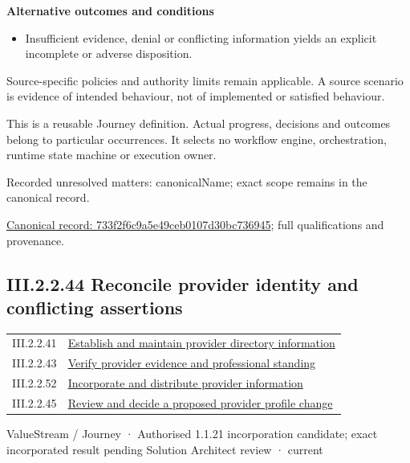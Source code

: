 \par\medskip\textbf{Alternative outcomes and conditions}\par


\begin{itemize}


\item Insufficient evidence, denial or conflicting information yields an explicit incomplete or adverse disposition.

\end{itemize}


Source-specific policies and authority limits remain applicable. A source scenario is evidence of intended behaviour, not of implemented or satisfied behaviour.



This is a reusable Journey definition. Actual progress, decisions and outcomes belong to particular occurrences. It selects no workflow engine, orchestration, runtime state machine or execution owner.


{\small Recorded unresolved matters: canonicalName; exact scope remains in the canonical record.}\par
{\footnotesize \href{../../../../continuum/strategy/value-stream/733f2f6c9a5e49ceb0107d30bc736945.md}{Canonical record: 733f2f6c9a5e49ceb0107d30bc736945}; full qualifications and provenance.}\par
\subsection*{III.2.2.44 Reconcile provider identity and conflicting assertions}
\label{navigation:III.2.2.44}

\begin{longtable}{p{.22\linewidth}p{.73\linewidth}}
III.2.2.41 & \hyperref[element:679b0055ee5d42d4a838e35edd3de01f]{Establish and maintain provider directory information} \\
III.2.2.43 & \hyperref[element:733f2f6c9a5e49ceb0107d30bc736945]{Verify provider evidence and professional standing} \\
III.2.2.52 & \hyperref[element:9eb9f3210d5e4b46ac21463f54e62ab9]{Incorporate and distribute provider information} \\
III.2.2.45 & \hyperref[element:d8e20e81429945caa1508b50956475b5]{Review and decide a proposed provider profile change} \\
\end{longtable}
\label{element:3afbc885a4a74b24a1240acb8725bad2}
{\small ValueStream / Journey · Authorised 1.1.21 incorporation candidate; exact incorporated result pending Solution Architect review · current}\par

